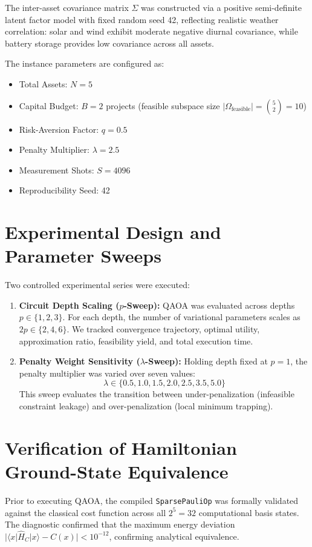 

The inter-asset covariance matrix $\Sigma$ was constructed via a positive semi-definite latent factor model with fixed random seed 42, reflecting realistic weather correlation: solar and wind exhibit moderate negative diurnal covariance, while battery storage provides low covariance across all assets.

The instance parameters are configured as:
\begin{itemize}
    \item Total Assets: $N = 5$
    \item Capital Budget: $B = 2$ projects (feasible subspace size $|\Omega_{\text{feasible}}| = \binom{5}{2} = 10$)
    \item Risk-Aversion Factor: $q = 0.5$
    \item Penalty Multiplier: $\lambda = 2.5$
    \item Measurement Shots: $S = 4096$
    \item Reproducibility Seed: 42
\end{itemize}

\section{Experimental Design and Parameter Sweeps}
Two controlled experimental series were executed:
\begin{enumerate}
    \item \textbf{Circuit Depth Scaling ($p$-Sweep):}
    QAOA was evaluated across depths $p \in \{1, 2, 3\}$. For each depth, the number of variational parameters scales as $2p \in \{2, 4, 6\}$. We tracked convergence trajectory, optimal utility, approximation ratio, feasibility yield, and total execution time.
    
    \item \textbf{Penalty Weight Sensitivity ($\lambda$-Sweep):}
    Holding depth fixed at $p = 1$, the penalty multiplier was varied over seven values:
    \begin{equation}
    \lambda \in \{0.5, 1.0, 1.5, 2.0, 2.5, 3.5, 5.0\}
    \end{equation}
    This sweep evaluates the transition between under-penalization (infeasible constraint leakage) and over-penalization (local minimum trapping).
\end{enumerate}

\section{Verification of Hamiltonian Ground-State Equivalence}
Prior to executing QAOA, the compiled \texttt{SparsePauliOp} was formally validated against the classical cost function across all $2^5 = 32$ computational basis states. The diagnostic confirmed that the maximum energy deviation $|\langle x | \hat{H}_C | x \rangle - C(x)| < 10^{-12}$, confirming analytical equivalence.

